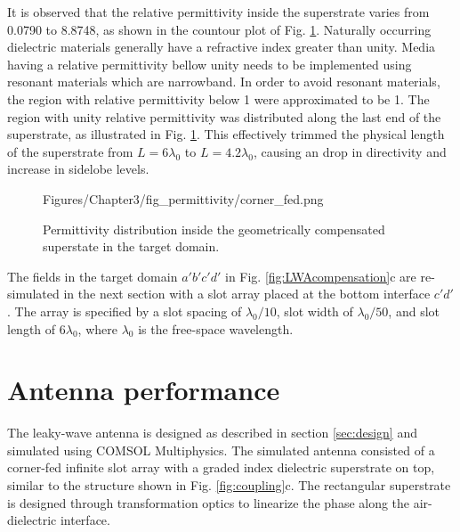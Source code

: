 It is observed that the relative permittivity inside the superstrate varies from 0.0790 to 8.8748, as shown in the countour plot of Fig. \ref{fig:permittivity}. Naturally occurring dielectric materials generally have a refractive index greater than unity. Media having a relative permittivity bellow unity needs to be implemented using resonant materials which are narrowband. In order to avoid resonant materials, the region with relative permittivity below 1 were approximated to be 1. The region with unity relative permittivity was distributed along the last end of the superstrate, as illustrated in Fig. \ref{fig:permittivity}. This effectively trimmed the physical length of the superstrate from $L=6 \lambda_0$ to $L=4.2 \lambda_0$, causing an drop in directivity and increase in sidelobe levels.%
\begin{figure} [t!]
\centering
 	\begin{overpic}[scale=0.8]{Figures/Chapter3/fig_permittivity/corner_fed.png}

  \end{overpic}

  \caption[Permittivity distribution inside the geometrically compensated superstate in the target domain.]{Permittivity distribution inside the geometrically compensated superstate in the target domain.}
\label{fig:permittivity}
\end{figure}

The fields in the target domain $a'b'c'd'$ in Fig. \ref{fig:LWAcompensation}c are re-simulated in the next section with a slot array placed at the bottom interface $c'd'$. The array is specified by a slot spacing of $\lambda_0/10$, slot width of $\lambda_0/50$, and slot length of $6\lambda_0$, where $\lambda_0$ is the free-space wavelength. 


\section{Antenna performance} \label{simres}
The leaky-wave antenna is designed as described in section \ref{sec:design} and simulated using COMSOL Multiphysics. The simulated antenna consisted of a corner-fed infinite slot array with a graded index dielectric superstrate on top, similar to the structure shown in Fig. \ref{fig:coupling}c. The rectangular superstrate is designed through transformation optics to linearize the phase along the air-dielectric interface. 

